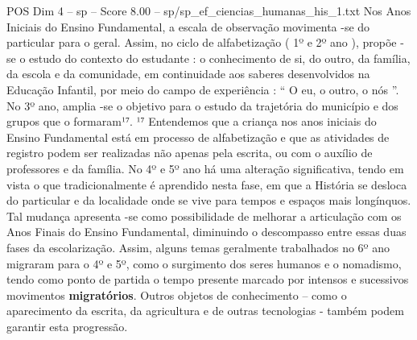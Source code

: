 \begin{textsample}{POS Dim 4 – sp – Score 8.00 – sp/sp\_ef\_ciencias\_humanas\_his\_1.txt}
Nos Anos Iniciais do Ensino Fundamental, a escala de observação movimenta -se do particular para o geral.
Assim, no ciclo de alfabetização ( 1º e 2º ano ), propõe -se o estudo do contexto do estudante : o conhecimento de si, do outro, da família, da escola e da comunidade, em continuidade aos saberes desenvolvidos na Educação Infantil, por meio do campo de experiência : “ O eu, o outro, o nós ”.
No 3º ano, amplia -se o objetivo para o estudo da trajetória do município e dos grupos que o formaram¹⁷. ¹⁷ Entendemos que a criança nos anos iniciais do Ensino Fundamental está em processo de alfabetização e que as atividades de registro podem ser realizadas não apenas pela escrita, ou com o auxílio de professores e da família.
No 4º e 5º ano há uma alteração significativa, tendo em vista o que tradicionalmente é aprendido nesta fase, em que a História se desloca do particular e da localidade onde se vive para tempos e espaços mais longínquos.
Tal mudança apresenta -se como possibilidade de melhorar a articulação com os Anos Finais do Ensino Fundamental, diminuindo o descompasso entre essas duas fases da escolarização.
Assim, alguns temas geralmente trabalhados no 6º ano migraram para o 4º e 5º, como o surgimento dos seres humanos e o nomadismo, tendo como ponto de partida o tempo presente marcado por intensos e sucessivos movimentos \textbf{migratórios}.
Outros objetos de conhecimento – como o aparecimento da escrita, da agricultura e de outras tecnologias - também podem garantir esta progressão.

\end{textsample}
